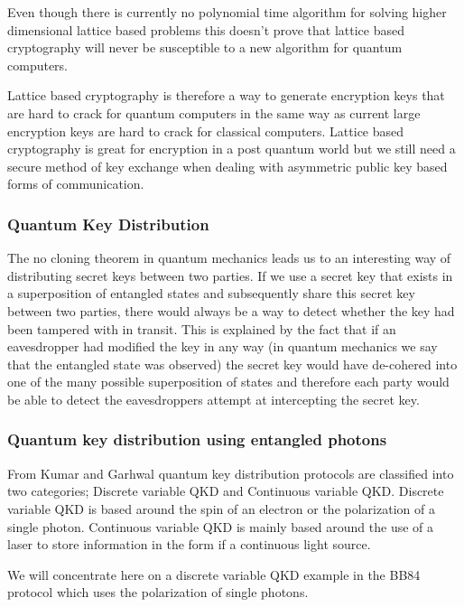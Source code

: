 \documentclass{article}
\begin{document}
Even though there is currently no polynomial time algorithm for solving higher dimensional lattice based problems this doesn't prove that lattice based cryptography will never be susceptible to a new algorithm for quantum computers.

\vspace{5mm}

Lattice based cryptography is therefore a way to generate encryption keys that are hard to crack for quantum computers in the same way as current large encryption keys are hard to crack for classical computers.  Lattice based cryptography is great for encryption in a post quantum world but we still need a secure method of key exchange when dealing with asymmetric public key based forms of communication.  

\subsubsection{Quantum Key Distribution}
The no cloning theorem in quantum mechanics leads us to an interesting way of distributing secret keys between two parties. If we use a secret key that exists in a superposition of entangled states and subsequently share this secret key between two parties, there would always be a way to detect whether the key had been tampered with in transit. This is explained by the fact that if an eavesdropper had modified the key in any way (in quantum mechanics we say that the entangled state was observed) the secret key would have de-cohered into one of the many possible superposition of states and therefore each party would be able to detect the eavesdroppers attempt at intercepting the secret key. 

\subsubsection{Quantum key distribution using entangled photons}
From Kumar and Garhwal \cite{Kumar2021State-of-the-ArtCryptography} quantum key distribution protocols are classified into two categories; Discrete variable QKD and Continuous variable QKD. Discrete variable QKD is based around the spin of an electron or the polarization of a single photon. Continuous variable QKD is mainly based around the use of a laser to store information in the form if a continuous light source.

We will concentrate here on a discrete variable QKD example in the BB84 protocol which uses the polarization of single photons.  
\end{document}
